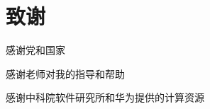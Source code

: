 \renewcommand{\baselinestretch}{1.5}
\fontsize{12pt}{13pt}\selectfont
{}
\chapter*{致谢}

感谢党和国家

感谢老师对我的指导和帮助

感谢中科院软件研究所和华为提供的计算资源

\clearpage
\endinput